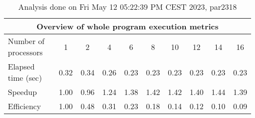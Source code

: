 \begin{table}[h]
\begin{center}
\begin{tabular}{|l|c|c|c|c|c|c|c|c|c|}
\hline
\multicolumn{10}{|c|}{Overview of whole program execution metrics} \\
\hline
\hline
Number of processors & 1 & 2 & 4 & 6 & 8 & 10 & 12 & 14 & 16 \\
\hline
Elapsed time (sec)      &       0.32 &       0.34 &       0.26 &       0.23 &       0.23 &       0.23 &       0.23 &       0.23 &       0.23 \\
\hline
Speedup                 &       1.00 &       0.96 &       1.24 &       1.38 &       1.42 &       1.42 &       1.40 &       1.44 &       1.39 \\
\hline
Efficiency              &       1.00 &       0.48 &       0.31 &       0.23 &       0.18 &       0.14 &       0.12 &       0.10 &       0.09 \\
\hline
\end{tabular}
\end{center}
\caption{ Analysis done on Fri May 12 05:22:39 PM CEST 2023, par2318}
\end{table}

